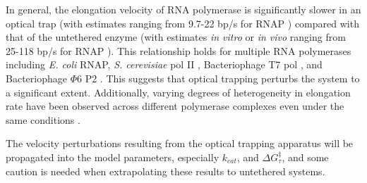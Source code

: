 \documentclass[10pt,letterpaper]{article}
\begin{document}
In general, the elongation velocity of RNA polymerase is significantly slower in an optical trap (with estimates ranging from 9.7-22 bp/s for RNAP \cite{neuman2003ubiquitous, davenport2000single, tolic2004diversity, mejia2015trigger, mejia2008thermal})  compared with that of the untethered enzyme (with estimates \textit{ in vitro} or \textit{ in vivo} ranging from 25-118 bp/s for RNAP \cite{iost1992bacteriophage, vogel1994rna, burns1998combinatorial, kingston1981direct}). This relationship holds for multiple RNA polymerases including \textit{E. coli} RNAP, \textit{S. cerevisiae} pol II \cite{galburt2009single, larson2012trigger, Dangkulwanich2013complete, kireeva2008transient}, Bacteriophage T7 pol \cite{skinner2004promoter, thomen2008t7, iost1992bacteriophage, anand2006transient}, and Bacteriophage $\Phi 6$ P2 \cite{dulin2015elongation, usala1980displacement}. This suggests that optical trapping perturbs the system to a significant extent. Additionally, varying degrees of heterogeneity in elongation rate have been observed across different polymerase complexes even under the same conditions \cite{tolic2004diversity, neuman2003ubiquitous, thomen2008t7}. \par

The velocity perturbations resulting from the optical trapping apparatus will be propagated into the model parameters, especially $k_{cat}$, and $\Delta G^\ddag_\tau$, and some caution is needed when extrapolating these results to untethered systems.   
\end{document}
